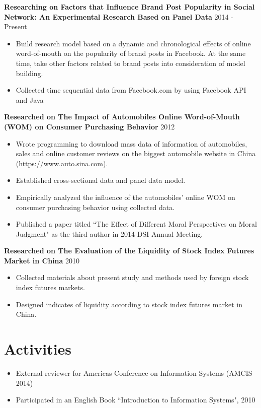 \documentclass[11pt,margin,line]{res}
\newcommand{\bulletindent}{11pt}
\begin{document}
\begin{resume}
{\bf Researching on Factors that Influence Brand Post Popularity in Social Network: An Experimental Research Based on Panel Data} \hfill 2014 - Present\\
    \begin{itemize}[leftmargin=\bulletindent]
        \itemsep -2pt
        \item Build research model based on a dynamic and chronological effects of online word-of-mouth on the popularity of brand posts in Facebook. At the same time, take other factors related to brand posts into consideration of model building.
        \item Collected time sequential data from Facebook.com by using Facebook API and Java
    \end{itemize}

{\bf Researched on The Impact of Automobiles Online Word-of-Mouth (WOM) on Consumer Purchasing Behavior} \hfill 2012
    \begin{itemize}[leftmargin=\bulletindent]
        \itemsep -2pt
        \item Wrote programming to download mass data of information of automobiles, sales and online customer reviews on the biggest automobile website in China (https://www.auto.sina.com).
        \item Established cross-sectional data and panel data model.
        \item Empirically analyzed the influence of the automobiles’ online WOM on consumer purchasing behavior using collected data.
        \item Published a paper titled ``The Effect of Different Moral Perspectives on Moral Judgment" as the third author in 2014 DSI Annual Meeting.
    \end{itemize}

{\bf Researched on The Evaluation of the Liquidity of Stock Index Futures Market in China} \hfill 2010
    \begin{itemize}[leftmargin=\bulletindent]
        \itemsep -2pt
				\item Collected materials about present study and methods used by foreign stock index futures markets.
				\item Designed indicates of liquidity according to stock index futures market in China.
    \end{itemize}

\section {Activities}
    \begin{itemize}[leftmargin=\bulletindent]
        \itemsep -2pt
				\item External reviewer for Americas Conference on Information Systems (AMCIS 2014)
				\item Participated in an English Book ``Introduction to Information Systems", 2010
    \end{itemize}



\end{resume}
\end{document}
